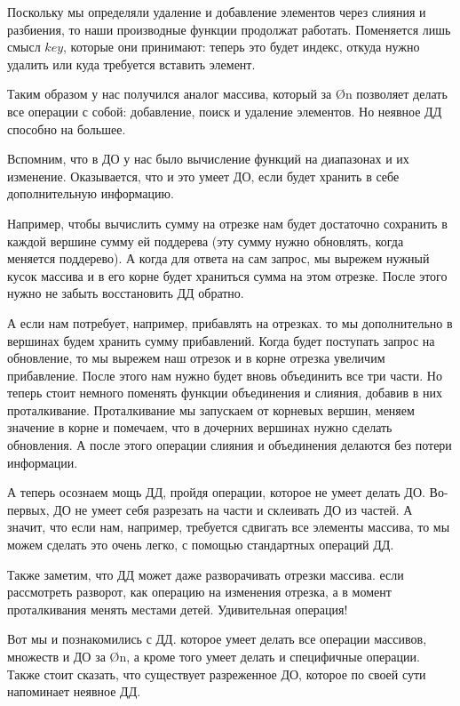 Поскольку мы определяли удаление и добавление элементов через слияния и разбиения, то наши производные функции продолжат работать. Поменяется лишь смысл $key$, которые они принимают: теперь это будет индекс, откуда нужно удалить или куда требуется вставить элемент.

Таким образом у нас получился аналог массива, который за \O{\log n} позволяет делать все операции с собой: добавление, поиск и удаление элементов. Но неявное ДД способно на большее.

Вспомним, что в ДО у нас было вычисление функций на диапазонах и их изменение. Оказывается, что и это умеет ДО, если будет хранить в себе дополнительную информацию.

Например, чтобы вычислить сумму на отрезке нам будет достаточно сохранить в каждой вершине сумму ей поддерева (эту сумму нужно обновлять, когда меняется поддерево). А когда для ответа на сам запрос, мы вырежем нужный кусок массива и в его корне будет храниться сумма на этом отрезке. После этого нужно не забыть восстановить ДД обратно.

А если нам потребует, например, прибавлять на отрезках. то мы дополнительно в вершинах будем хранить сумму прибавлений. Когда будет поступать запрос на обновление, то мы вырежем наш отрезок и в корне отрезка увеличим прибавление. После этого нам нужно будет вновь объединить все три части. Но теперь стоит немного поменять функции объединения и слияния, добавив в них проталкивание. Проталкивание мы запускаем от корневых вершин, меняем значение в корне и помечаем, что в дочерних вершинах нужно сделать обновления. А после этого операции слияния и объединения делаются без потери информации.

А теперь осознаем мощь ДД, пройдя операции, которое не умеет делать ДО. Во-первых, ДО не умеет себя разрезать на части и склеивать ДО из частей. А значит, что если нам, например, требуется сдвигать все элементы массива, то мы можем сделать это очень легко, с помощью стандартных операций ДД.

Также заметим, что ДД может даже разворачивать отрезки массива. если рассмотреть разворот, как операцию на изменения отрезка, а в момент проталкивания менять местами детей. Удивительная операция!

Вот мы и познакомились с ДД. которое умеет делать все операции массивов, множеств и ДО за \O{\log n}, а кроме того умеет делать и специфичные операции. Также стоит сказать, что существует разреженное ДО, которое по своей сути напоминает неявное ДД.


